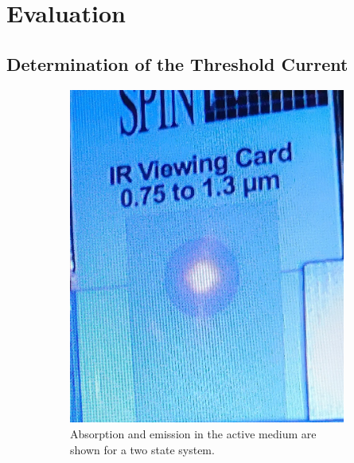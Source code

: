 \newpage
\section{Evaluation}
\label{sec:evaluation}
\subsection{Determination of the Threshold Current}
\begin{figure}[ht]
    \centering
    \begin{subfigure}{0.49\textwidth}
        \includegraphics[width=\textwidth]{bilder/laser_before.jpg}
        \caption{Absorption and emission in the active medium are shown for a two state system. \cite{anleitungHeNe}}
        \label{fig:laser_before}
    \end{subfigure}
    \hfill
    \begin{subfigure}{0.49\textwidth}

\end{subfigure}
\end{figure}
